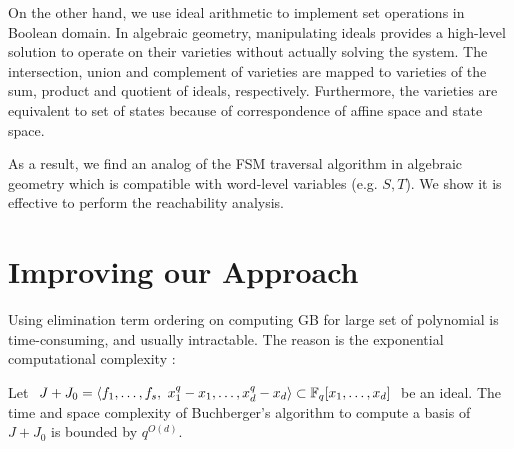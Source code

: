 \begin{figure}[H]
\end{figure}

On the other hand, we use ideal arithmetic to implement set operations in Boolean domain.
In algebraic geometry, manipulating ideals provides a high-level solution to 
operate on their varieties without actually solving the system. The intersection, union and 
complement of varieties are mapped to varieties of the sum, product and quotient of ideals, respectively.
Furthermore, the varieties are equivalent to set of states because of correspondence of 
affine space and state space.

As a result, we find an analog of the FSM traversal algorithm in algebraic geometry which is 
compatible with word-level variables (e.g. $S,T$). We show it is effective to perform the 
reachability analysis.

\section{Improving our Approach}
\label{sec:improve}

Using elimination term ordering on computing GB for large set of polynomial is time-consuming, and usually 
intractable. The reason is the exponential computational complexity \cite{gao:gf-gb-ms}:
\begin{Theorem}
Let $J+J_0 = \langle f_1, \dots, f_s, ~x_1^q - x_1, \dots, x_d^q -
x_d\rangle \subset {\mathbb{F}}_{q} [x_1, \dots, x_d]$ be an ideal. The time and
space complexity of Buchberger's algorithm to compute a \Grobner
basis of $J+J_0$ is bounded by $q^{O(d)}$.
\end{Theorem}

